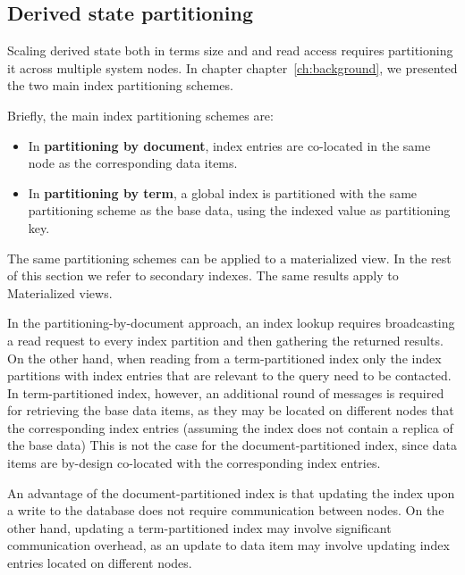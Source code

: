 \subsection{Derived state partitioning}
\label{sec:index_partitioning_design_space}


Scaling derived state both in terms size and and read access requires partitioning it across multiple system nodes.
In chapter chapter~\ref{ch:background}, we presented the two main index partitioning schemes.

Briefly, the main index partitioning schemes are:
\begin{itemize}

  \item In \textbf{partitioning by document}, index entries are co-located in the same node as the corresponding
  data items.

  \item In \textbf{partitioning by term}, a global index is partitioned with the same partitioning scheme as the base data,
  using the indexed value as partitioning key.

\end{itemize}

The same partitioning schemes can be applied to a materialized view.
In the rest of this section we refer to secondary indexes.
The same results apply to Materialized views.

\medskip

In the partitioning-by-document approach, an index lookup requires broadcasting a read request to every index partition
and then gathering the returned results.
On the other hand, when reading from a term-partitioned index only the index partitions with index entries that are
relevant to the query need to be contacted.
In term-partitioned index, however, an additional round of messages is required for retrieving the base data items,
as they may be located on different nodes that the corresponding index entries (assuming the index does not contain a
replica of the base data)
This is not the case for the document-partitioned index, since data items are by-design co-located with the corresponding
index entries.

An advantage of the document-partitioned index is that updating the index upon a write to the database does not require
communication between nodes.
On the other hand, updating a term-partitioned index may involve significant communication overhead, as an update to data
item may involve updating index entries located on different nodes.

